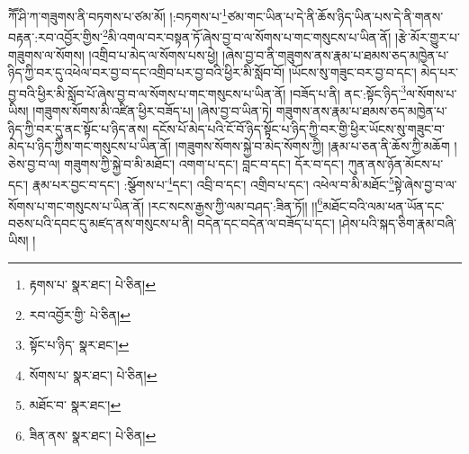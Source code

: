 ཀཽ་ཤི་ཀ་གཟུགས་ནི་བཏགས་པ་ཙམ་མོ། །:བཏགས་པ་\footnote{རྟགས་པ་  སྣར་ཐང་།  པེ་ཅིན། }ཙམ་གང་ཡིན་པ་དེ་ནི་ཆོས་ཉིད་ཡིན་པས་དེ་ནི་གནས་བརྟན་:རབ་འབྱོར་གྱིས་\footnote{རབ་འབྱོར་གྱི་  པེ་ཅིན། }མི་འགལ་བར་བསྟན་ཏོ་ཞེས་བྱ་བ་ལ་སོགས་པ་གང་གསུངས་པ་ཡིན་ནོ། །རྩེ་མོར་གྱུར་པ་གཟུགས་ལ་སོགས། །འགྲིབ་པ་མེད་ལ་སོགས་པས་ཕྱེ། །ཞེས་བྱ་བ་ནི་གཟུགས་ནས་རྣམ་པ་ཐམས་ཅད་མཁྱེན་པ་ཉིད་ཀྱི་བར་དུ་འཕེལ་བར་བྱ་བ་དང་འགྲིབ་པར་བྱ་བའི་ཕྱིར་མི་སློབ་བོ། །ཡོངས་སུ་གཟུང་བར་བྱ་བ་དང་། མེད་པར་བྱ་བའི་ཕྱིར་མི་སློབ་པོ་ཞེས་བྱ་བ་ལ་སོགས་པ་གང་གསུངས་པ་ཡིན་ནོ། །བཟོད་པ་ནི། ནང་:སྟོང་ཉིད་\footnote{སྟོང་པ་ཉིད་  སྣར་ཐང་། }ལ་སོགས་པ་ཡིས། །གཟུགས་སོགས་མི་འཛིན་ཕྱིར་བཟོད་པ། །ཞེས་བྱ་བ་ཡིན་ཏེ། གཟུགས་ནས་རྣམ་པ་ཐམས་ཅད་མཁྱེན་པ་ཉིད་ཀྱི་བར་དུ་ནང་སྟོང་པ་ཉིད་ནས། དངོས་པོ་མེད་པའི་ངོ་བོ་ཉིད་སྟོང་པ་ཉིད་ཀྱི་བར་གྱི་ཕྱིར་ཡོངས་སུ་གཟུང་བ་མེད་པ་ཉིད་ཀྱིས་གང་གསུངས་པ་ཡིན་ནོ། །གཟུགས་སོགས་སྐྱེ་བ་མེད་སོགས་ཀྱི། །རྣམ་པ་ཅན་ནི་ཆོས་ཀྱི་མཆོག །ཅེས་བྱ་བ་ལ། གཟུགས་ཀྱི་སྐྱེ་བ་མི་མཐོང་། འགག་པ་དང་། བླང་བ་དང་། དོར་བ་དང་། ཀུན་ནས་ཉོན་མོངས་པ་དང་། རྣམ་པར་བྱང་བ་དང་། :སྩོགས་པ་\footnote{སོགས་པ་  སྣར་ཐང་།  པེ་ཅིན། }དང་། འབྲི་བ་དང་། འགྲིབ་པ་དང་། འཕེལ་བ་མི་མཐོང་\footnote{མཐོང་བ་  སྣར་ཐང་། }སྟེ་ཞེས་བྱ་བ་ལ་སོགས་པ་གང་གསུངས་པ་ཡིན་ནོ། །རང་སངས་རྒྱས་ཀྱི་ལམ་བཤད་:ཟིན་ཏོ།། །།\footnote{ཟིན་ནས་  སྣར་ཐང་།  པེ་ཅིན། }མཐོང་བའི་ལམ་ཕན་ཡོན་དང་བཅས་པའི་དབང་དུ་མཛད་ནས་གསུངས་པ་ནི། བདེན་དང་བདེན་ལ་བཟོད་པ་དང་། །ཤེས་པའི་སྐད་ཅིག་རྣམ་བཞི་ཡིས། །
